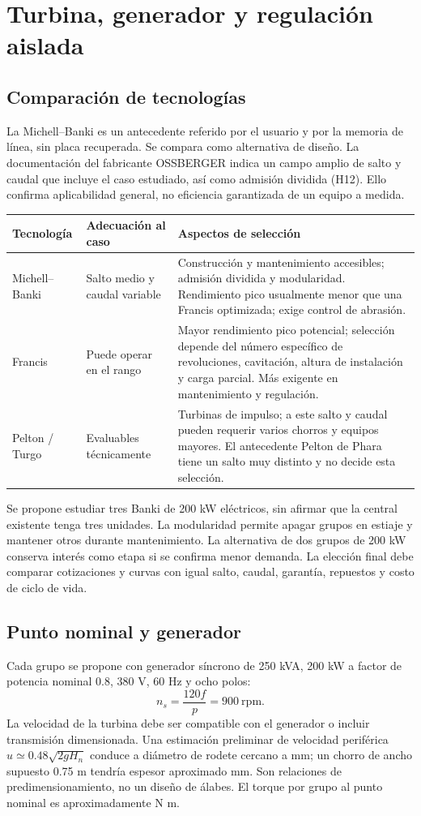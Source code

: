 \chapter{Turbina, generador y regulación aislada}
\section{Comparación de tecnologías}
La Michell--Banki es un antecedente referido por el usuario y por la memoria de línea, sin placa recuperada. Se compara como alternativa de diseño. La documentación del fabricante OSSBERGER indica un campo amplio de salto y caudal que incluye el caso estudiado, así como admisión dividida (H12). Ello confirma aplicabilidad general, no eficiencia garantizada de un equipo a medida.
\begin{longtable}{L{2.3cm}L{4.2cm}L{7cm}}\toprule Tecnología & Adecuación al caso & Aspectos de selección \\ \midrule
Michell--Banki & Salto medio y caudal variable & Construcción y mantenimiento accesibles; admisión dividida y modularidad. Rendimiento pico usualmente menor que una Francis optimizada; exige control de abrasión.\\
Francis & Puede operar en el rango & Mayor rendimiento pico potencial; selección depende del número específico de revoluciones, cavitación, altura de instalación y carga parcial. Más exigente en mantenimiento y regulación.\\
Pelton / Turgo & Evaluables técnicamente & Turbinas de impulso; a este salto y caudal pueden requerir varios chorros y equipos mayores. El antecedente Pelton de Phara tiene un salto muy distinto y no decide esta selección.\\ \bottomrule\end{longtable}
Se propone estudiar tres Banki de 200 kW eléctricos, sin afirmar que la central existente tenga tres unidades. La modularidad permite apagar grupos en estiaje y mantener otros durante mantenimiento. La alternativa de dos grupos de 200 kW conserva interés como etapa si se confirma menor demanda. La elección final debe comparar cotizaciones y curvas con igual salto, caudal, garantía, repuestos y costo de ciclo de vida.

\section{Punto nominal y generador}
Cada grupo se propone con generador síncrono de 250 kVA, 200 kW a factor de potencia nominal 0.8, 380 V, 60 Hz y ocho polos:
\begin{equation}n_s=\frac{120f}{p}=900\ \mathrm{rpm}.\end{equation}
La velocidad de la turbina debe ser compatible con el generador o incluir transmisión dimensionada. Una estimación preliminar de velocidad periférica \(u\simeq0.48\sqrt{2gH_n}\) conduce a diámetro de rodete cercano a  mm; un chorro de ancho supuesto 0.75 m tendría espesor aproximado  mm. Son relaciones de predimensionamiento, no un diseño de álabes. El torque por grupo al punto nominal es aproximadamente  N m.

